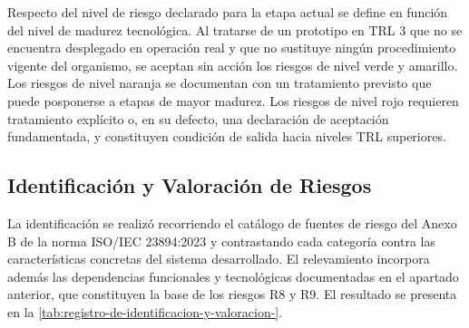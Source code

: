
Respecto del nivel de riesgo declarado para la etapa actual se define en función del nivel de madurez tecnológica. Al tratarse de un prototipo en TRL 3 que no se encuentra desplegado en operación real y que no sustituye ningún procedimiento vigente del organismo, se aceptan sin acción los riesgos de nivel verde y amarillo. Los riesgos de nivel naranja se documentan con un tratamiento previsto que puede posponerse a etapas de mayor madurez. Los riesgos de nivel rojo requieren tratamiento explícito o, en su defecto, una declaración de aceptación fundamentada, y constituyen condición de salida hacia niveles TRL superiores.

\subsection{Identificación y Valoración de Riesgos}\label{identificaciuxf3n-y-valoraciuxf3n-de-riesgos}

La identificación se realizó recorriendo el catálogo de fuentes de riesgo del Anexo B de la norma ISO/IEC 23894:2023 y contrastando cada categoría contra las características concretas del sistema desarrollado. El relevamiento incorpora además las dependencias funcionales y tecnológicas documentadas en el apartado anterior, que constituyen la base de los riesgos R8 y R9. El resultado se presenta en la \cref{tab:registro-de-identificacion-y-valoracion-}.

